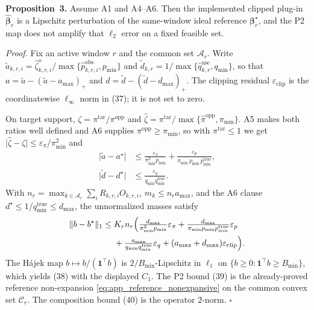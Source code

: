 \noindent\textbf{Proposition~3.}
Assume A1 and A4--A6.  Then the implemented clipped plug-in
$\widehat{\boldsymbol\beta}_r$ is a Lipschitz perturbation of the
same-window ideal reference $\boldsymbol\beta_r^\star$, and the P2 map
does not amplify that $\ell_2$ error on a fixed feasible set.

\noindent\emph{Proof.}
Fix an active window $r$ and the common set $\mathcal{A}_r$.
Write $\widetilde a_{k,r,i}=\widehat\zeta^{o}_{k,r,i}/
\max\{\widehat p^{\mathrm{obs}}_{k,r,i},p_{\min}\}$ and
$\widetilde d_{k,r}=1/\max\{\widehat q^{\mathrm{use}}_{k,r},q_{\min}\}$,
so that
$a=\widetilde a-(\widetilde a-a_{\max})_+$ and
$d=\widetilde d-(\widetilde d-d_{\max})_+$.
The clipping residual $\varepsilon_{\mathrm{clip}}$ is the
coordinatewise $\ell_{\infty}$ norm in (37); it is not set to zero.

On target support, $\zeta=\pi^{\mathrm{tar}}/\pi^{\mathrm{opp}}$ and
$\widehat\zeta=\pi^{\mathrm{tar}}/\max\{\widehat\pi^{\mathrm{opp}},
\pi_{\min}\}$.  A5 makes both ratios well defined and A6 supplies
$\pi^{\mathrm{opp}}\ge\pi_{\min}$, so with $\pi^{\mathrm{tar}}\le1$ we get
$\lvert\widehat\zeta-\zeta\rvert\le\varepsilon_\pi/\pi_{\min}^2$ and
\begin{equation}
\begin{aligned}
 \bigl\lvert\widetilde a-a^\star\bigr\rvert
 &\le
 \frac{\varepsilon_\pi}{\pi_{\min}^2 p_{\min}}
 +\frac{\varepsilon_p}{\pi_{\min}\,p_{\min}\,p_{\min}^{\mathrm{true}}},\\
 \bigl\lvert\widetilde d-d^\star\bigr\rvert
 &\le
 \frac{\varepsilon_q}{q_{\min}q_{\min}^{\mathrm{true}}}.
\end{aligned}
 \label{eq:app_plugin_lipschitz}
\end{equation}
With $n_r=\max_{k\in\mathcal{A}_r}\sum_i R_{k,r,i}O_{k,r,i}$,
$m_k\le n_r a_{\max}$, and the A6 clause
$d^\star\le 1/q_{\min}^{\mathrm{true}}\le d_{\max}$,
the unnormalized masses satisfy
\begin{equation}
\begin{aligned}
 \|b-b^\star\|_1
 \le{}&
 K_r n_r
 \Bigl(
 \tfrac{d_{\max}}{\pi_{\min}^2 p_{\min}}\varepsilon_\pi
 +\tfrac{d_{\max}}{\pi_{\min}p_{\min}p_{\min}^{\mathrm{true}}}\varepsilon_p\\
 &+\tfrac{a_{\max}}{q_{\min}q_{\min}^{\mathrm{true}}}\varepsilon_q
 +(a_{\max}+d_{\max})\varepsilon_{\mathrm{clip}}
 \Bigr).
\end{aligned}
 \label{eq:app_plugin_mass}
\end{equation}
The H\'ajek map $b\mapsto b/(\mathbf{1}^{\top}b)$ is
$2/B_{\min}$-Lipschitz in $\ell_1$ on
$\{b\ge0:\mathbf{1}^{\top}b\ge B_{\min}\}$, which yields
(38) with the displayed $C_1$.
The P2 bound (39) is the already-proved reference
non-expansion \eqref{eq:app_reference_nonexpansive} on the common
convex set $\mathcal{C}_r$.  The composition bound
(40) is the operator $2$-norm.
\hfill$\square$

